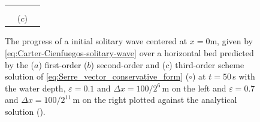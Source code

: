 \documentclass[preprint,sort&compress,1p]{article}
\begin{document}
\begin{figure}[htb]
\begin{tabular}{ccc}
\begin{psfrags}
\end{psfrags} \\ \\
& ($c$) &
\end{tabular}
\caption{The progress of a initial solitary wave centered at $x = 0$m,  given by \eqref{eq:Carter-Cienfuegos-solitary-wave} over a horizontal bed predicted by the ($a$) first-order ($b$) second-order and ($c$) third-order  scheme solution of \eqref{eq:Serre_vector_conservative_form} (\color{red}$\circ$\color{black}) at $t = 50$\,s with the water depth, $\varepsilon = 0.1$ and $\Delta x = 100/2^6$\,m on the left and $\varepsilon = 0.7$ and $\Delta x = 100/2^{11}$\,m on the right plotted against the analytical solution (\color{blue}\textemdash\color{black}).}
\label{fig:Solitary_wave_simulation}
\end{figure}
\end{document}
